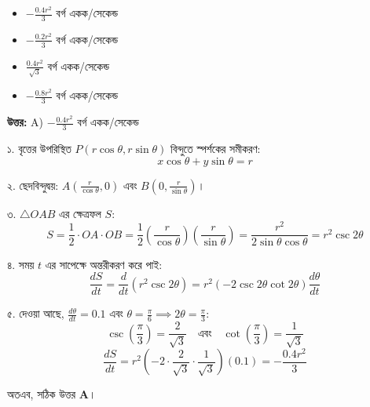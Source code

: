\documentclass[12pt, a4paper]{article}
\begin{document}
\vspace{1em}
\begin{itemize}[label={}, leftmargin=1cm, itemsep=0.5em]
    \item[\textbf{A)}] $-\frac{0.4 r^2}{3}$ বর্গ একক/সেকেন্ড
    \item[\textbf{B)}] $-\frac{0.2 r^2}{3}$ বর্গ একক/সেকেন্ড
    \item[\textbf{C)}] $\frac{0.4 r^2}{\sqrt{3}}$ বর্গ একক/সেকেন্ড
    \item[\textbf{D)}] $-\frac{0.8 r^2}{3}$ বর্গ একক/সেকেন্ড
\end{itemize}

\vspace{0.5em}
\begin{tcolorbox}[answerbox]
    \textbf{\color{success} উত্তর:} A) $-\frac{0.4 r^2}{3}$ বর্গ একক/সেকেন্ড
\end{tcolorbox}
\vspace{1em}

\begin{tcolorbox}[solutionbox={সমাধান (Solution)}]
    \noindent
    ১. বৃত্তের উপরিস্থিত $P(r\cos\theta, r\sin\theta)$ বিন্দুতে স্পর্শকের সমীকরণ: 
    \[ x\cos\theta + y\sin\theta = r \]
    
    ২. ছেদবিন্দুদ্বয়: $A\left(\frac{r}{\cos\theta}, 0\right)$ এবং $B\left(0, \frac{r}{\sin\theta}\right)$। 
    
    ৩. $\triangle OAB$ এর ক্ষেত্রফল $S$: 
    \[ S = \frac{1}{2} \cdot OA \cdot OB = \frac{1}{2} \left(\frac{r}{\cos\theta}\right)\left(\frac{r}{\sin\theta}\right) = \frac{r^2}{2\sin\theta\cos\theta} = r^2 \csc 2\theta \]
    
    ৪. সময় $t$ এর সাপেক্ষে অন্তরীকরণ করে পাই: 
    \[ \frac{dS}{dt} = \frac{d}{dt}(r^2 \csc 2\theta) = r^2 \left(-2 \csc 2\theta \cot 2\theta\right) \frac{d\theta}{dt} \]
    
    ৫. দেওয়া আছে, $\frac{d\theta}{dt} = 0.1$ এবং $\theta = \frac{\pi}{6} \implies 2\theta = \frac{\pi}{3}$: 
    \[ \csc\left(\frac{\pi}{3}\right) = \frac{2}{\sqrt{3}} \quad \text{এবং} \quad \cot\left(\frac{\pi}{3}\right) = \frac{1}{\sqrt{3}} \]
    \[ \frac{dS}{dt} = r^2 \left(-2 \cdot \frac{2}{\sqrt{3}} \cdot \frac{1}{\sqrt{3}}\right) (0.1) = -\frac{0.4 r^2}{3} \]
    
    অতএব, সঠিক উত্তর \textbf{A}।
\end{tcolorbox}

\vspace{2em}
\end{document}
